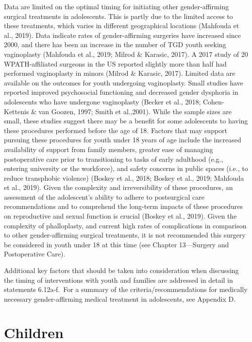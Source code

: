 \documentclass[
]{book}
\begin{document}
Data are limited on the optimal timing for initiating other gender-affirming surgical treatments
in adolescents. This is partly due to the limited
access to these treatments, which varies in different geographical locations (Mahfouda et al., 2019).
Data indicate rates of gender-affirming surgeries
have increased since 2000, and there has been an
increase in the number of TGD youth seeking
vaginoplasty (Mahfouda et al., 2019; Milrod \&
Karasic, 2017). A 2017 study of 20 WPATH-affiliated
surgeons in the US reported slightly more than
half had performed vaginoplasty in minors (Milrod
\& Karasic, 2017). Limited data are available on
the outcomes for youth undergoing vaginoplasty.
Small studies have reported improved psychosocial
functioning and decreased gender dysphoria in
adolescents who have undergone vaginoplasty
(Becker et al., 2018; Cohen-Kettenis \& van Goozen,
1997; Smith et al.,2001). While the sample sizes
are small, these studies suggest there may be a
benefit for some adolescents to having these procedures performed before the age of 18. Factors
that may support pursuing these procedures for
youth under 18 years of age include the increased
availability of support from family members,
greater ease of managing postoperative care prior
to transitioning to tasks of early adulthood (e.g.,
entering university or the workforce), and safety
concerns in public spaces (i.e., to reduce transphobic violence) (Boskey et al., 2018; Boskey et al.,
2019; Mahfouda et al., 2019). Given the complexity
and irreversibility of these procedures, an assessment of the adolescent's ability to adhere to postsurgical care recommendations and to comprehend
the long-term impacts of these procedures on
reproductive and sexual function is crucial (Boskey
et al., 2019). Given the complexity of phalloplasty,
and current high rates of complications in comparison to other gender-affirming surgical treatments, it is not recommended this surgery be
considered in youth under 18 at this time (see
Chapter 13---Surgery and Postoperative Care).

Additional key factors that should be taken
into consideration when discussing the timing of
interventions with youth and families are
addressed in detail in statements 6.12a-f.~For a
summary of the criteria/recommendations for
medically necessary gender-affirming medical
treatment in adolescents, see Appendix D.

\hypertarget{children}{%
\chapter{Children}\label{children}}
\end{document}
